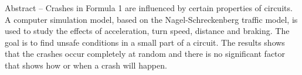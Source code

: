 Abstract -- Crashes in Formula 1 are influenced by certain properties of circuits. A computer simulation model, based on the Nagel-Schreckenberg traffic model, is used to study the effects of acceleration, turn speed, distance and braking. The goal is to find unsafe conditions in a small part of a circuit. The results shows that the crashes occur completely at random and there is no significant factor that shows how or when a crash will happen.
